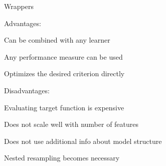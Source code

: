 \documentclass[11pt,compress,t,notes=noshow, xcolor=table]{beamer}
\begin{document}
  \begin{vbframe}{Wrappers}

    \begin{blocki}{Advantages:}
      \item Can be combined with any learner
      \item Any performance measure can be used
      \item Optimizes the desired criterion directly
    \end{blocki}

    \lz

    \begin{blocki}{Disadvantages:}
      \item Evaluating target function is expensive
      \item Does not scale well with number of features%
      \item Does not use additional info about model structure
      \item Nested resampling becomes necessary
    \end{blocki}

  \end{vbframe}


  \endlecture
\end{document}
